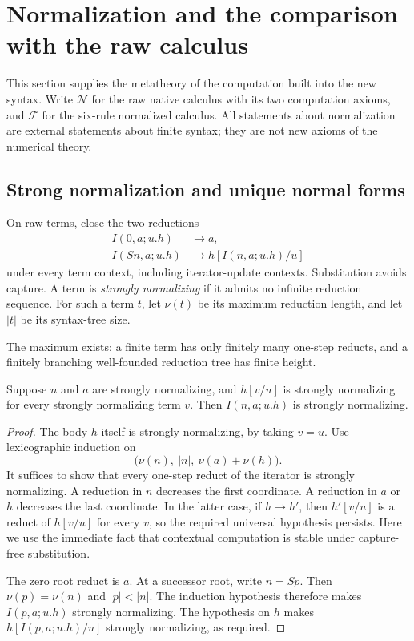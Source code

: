 \section{Normalization and the comparison with the raw calculus}
\label{sec:fullnf-metatheory}

This section supplies the metatheory of the computation built into the
new syntax.  Write $\mathcal N$ for the raw native calculus with its two
computation axioms, and $\mathcal F$ for the six-rule normalized calculus.
All statements about normalization are external statements about finite
syntax; they are not new axioms of the numerical theory.

\subsection{Strong normalization and unique normal forms}

\begin{definition}
On raw terms, close the two reductions
\begin{equation}
\begin{aligned}
 I(0,a;u.h)&\longrightarrow a,\\
 I(Sn,a;u.h)&\longrightarrow h[I(n,a;u.h)/u]
\end{aligned}
\label{eq:fullnf-reductions}
\end{equation}
under every term context, including iterator-update contexts.  Substitution
avoids capture.  A term is \emph{strongly normalizing} if it admits no
infinite reduction sequence.  For such a term $t$, let $\nu(t)$ be its
maximum reduction length, and let $|t|$ be its syntax-tree size.
\end{definition}

The maximum exists: a finite term has only finitely many one-step reducts,
and a finitely branching well-founded reduction tree has finite height.

\begin{lemma}
\label{lem:fullnf-closure}
Suppose $n$ and $a$ are strongly normalizing, and $h[v/u]$ is strongly
normalizing for every strongly normalizing term $v$.  Then
$I(n,a;u.h)$ is strongly normalizing.
\end{lemma}
\begin{proof}
The body $h$ itself is strongly normalizing, by taking $v=u$.
Use lexicographic induction on
\[
  \bigl(\nu(n),\ |n|,\ \nu(a)+\nu(h)\bigr).
\]
It suffices to show that every one-step reduct of the iterator is strongly
normalizing.  A reduction in $n$ decreases the first coordinate.  A reduction
in $a$ or $h$ decreases the last coordinate.  In the latter case, if
$h\longrightarrow h'$, then $h'[v/u]$ is a reduct of $h[v/u]$ for every
$v$, so the required universal hypothesis persists.  Here we use the
immediate fact that contextual computation is stable under capture-free
substitution.

The zero root reduct is $a$.  At a successor root, write $n=Sp$.
Then $\nu(p)=\nu(n)$ and $|p|<|n|$.  The induction hypothesis therefore
makes $I(p,a;u.h)$ strongly normalizing.  The hypothesis on $h$ makes
$h[I(p,a;u.h)/u]$ strongly normalizing, as required.
\end{proof}

